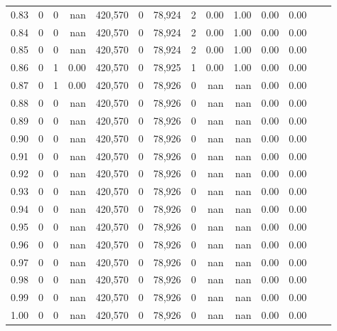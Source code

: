 \begin{tabular}{rrrrrrrrrrrrrr}
0.83 &       0 &      0 &      nan &  420,570 &        0 &  78,924 &       2 &  0.00 &  1.00 &  0.00 &      0.00 \\
0.84 &       0 &      0 &      nan &  420,570 &        0 &  78,924 &       2 &  0.00 &  1.00 &  0.00 &      0.00 \\
0.85 &       0 &      0 &      nan &  420,570 &        0 &  78,924 &       2 &  0.00 &  1.00 &  0.00 &      0.00 \\
0.86 &       0 &      1 &     0.00 &  420,570 &        0 &  78,925 &       1 &  0.00 &  1.00 &  0.00 &      0.00 \\
0.87 &       0 &      1 &     0.00 &  420,570 &        0 &  78,926 &       0 &   nan &   nan &  0.00 &      0.00 \\
0.88 &       0 &      0 &      nan &  420,570 &        0 &  78,926 &       0 &   nan &   nan &  0.00 &      0.00 \\
0.89 &       0 &      0 &      nan &  420,570 &        0 &  78,926 &       0 &   nan &   nan &  0.00 &      0.00 \\
0.90 &       0 &      0 &      nan &  420,570 &        0 &  78,926 &       0 &   nan &   nan &  0.00 &      0.00 \\
0.91 &       0 &      0 &      nan &  420,570 &        0 &  78,926 &       0 &   nan &   nan &  0.00 &      0.00 \\
0.92 &       0 &      0 &      nan &  420,570 &        0 &  78,926 &       0 &   nan &   nan &  0.00 &      0.00 \\
0.93 &       0 &      0 &      nan &  420,570 &        0 &  78,926 &       0 &   nan &   nan &  0.00 &      0.00 \\
0.94 &       0 &      0 &      nan &  420,570 &        0 &  78,926 &       0 &   nan &   nan &  0.00 &      0.00 \\
0.95 &       0 &      0 &      nan &  420,570 &        0 &  78,926 &       0 &   nan &   nan &  0.00 &      0.00 \\
0.96 &       0 &      0 &      nan &  420,570 &        0 &  78,926 &       0 &   nan &   nan &  0.00 &      0.00 \\
0.97 &       0 &      0 &      nan &  420,570 &        0 &  78,926 &       0 &   nan &   nan &  0.00 &      0.00 \\
0.98 &       0 &      0 &      nan &  420,570 &        0 &  78,926 &       0 &   nan &   nan &  0.00 &      0.00 \\
0.99 &       0 &      0 &      nan &  420,570 &        0 &  78,926 &       0 &   nan &   nan &  0.00 &      0.00 \\
1.00 &       0 &      0 &      nan &  420,570 &        0 &  78,926 &       0 &   nan &   nan &  0.00 &      0.00 \\
\bottomrule
\end{tabular}
